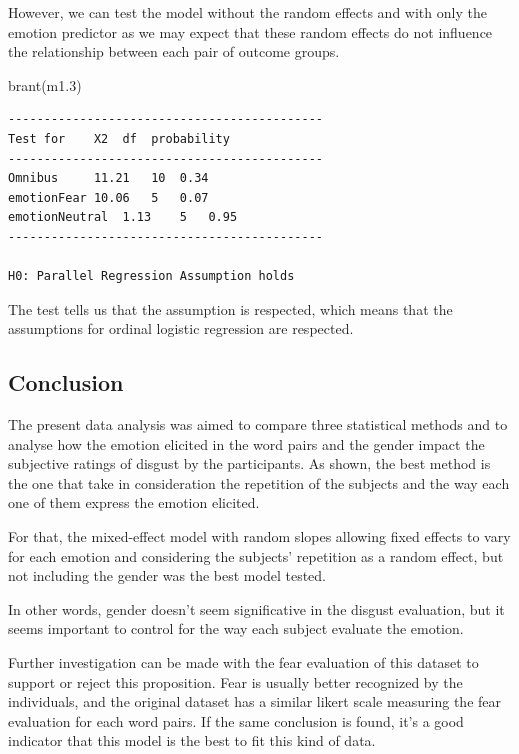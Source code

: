 \documentclass[
]{article}
\newenvironment{Shaded}{\begin{snugshade}}{\end{snugshade}}
\newcommand{\FloatTok}[1]{\textcolor[rgb]{0.00,0.00,0.81}{#1}}
\newcommand{\FunctionTok}[1]{\textcolor[rgb]{0.00,0.00,0.00}{#1}}
\newcommand{\NormalTok}[1]{#1}
\begin{document}
However, we can test the model without the random effects and with only
the emotion predictor as we may expect that these random effects do not
influence the relationship between each pair of outcome groups.

\begin{Shaded}
\begin{Highlighting}[]
\FunctionTok{brant}\NormalTok{(m1}\FloatTok{.3}\NormalTok{)}
\end{Highlighting}
\end{Shaded}

\begin{verbatim}
-------------------------------------------- 
Test for    X2  df  probability 
-------------------------------------------- 
Omnibus     11.21   10  0.34
emotionFear 10.06   5   0.07
emotionNeutral  1.13    5   0.95
-------------------------------------------- 

H0: Parallel Regression Assumption holds
\end{verbatim}

The test tells us that the assumption is respected, which means that the
assumptions for ordinal logistic regression are respected.

\hypertarget{conclusion}{%
\subsection{Conclusion}\label{conclusion}}

The present data analysis was aimed to compare three statistical methods
and to analyse how the emotion elicited in the word pairs and the gender
impact the subjective ratings of disgust by the participants. As shown,
the best method is the one that take in consideration the repetition of
the subjects and the way each one of them express the emotion elicited.

For that, the mixed-effect model with random slopes allowing fixed
effects to vary for each emotion and considering the subjects'
repetition as a random effect, but not including the gender was the best
model tested.

In other words, gender doesn't seem significative in the disgust
evaluation, but it seems important to control for the way each subject
evaluate the emotion.

Further investigation can be made with the fear evaluation of this
dataset to support or reject this proposition. Fear is usually better
recognized by the individuals, and the original dataset has a similar
likert scale measuring the fear evaluation for each word pairs. If the
same conclusion is found, it's a good indicator that this model is the
best to fit this kind of data.\\
\end{document}
